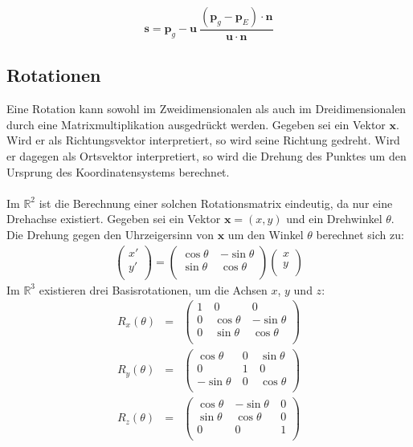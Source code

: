 \begin{equation}
\bm{s} = \bm{p}_g - \bm{u}\ \frac{(\bm{p}_g - \bm{p}_E)\cdot\bm{n}}{\bm{u}\cdot\bm{n}}
\end{equation}

\subsection{Rotationen}
\label{anhang_b_rotations}
Eine Rotation kann sowohl im Zweidimensionalen als auch im Dreidimensionalen durch eine Matrixmultiplikation ausgedrückt werden. Gegeben sei ein Vektor $\bm{x}$. Wird er als Richtungsvektor interpretiert, so wird seine Richtung gedreht. Wird er dagegen als Ortsvektor interpretiert, so wird die Drehung des Punktes um den Ursprung des Koordinatensystems berechnet.\\
\\
Im $\mathbb{R}^2$ ist die Berechnung einer solchen Rotationsmatrix eindeutig, da nur eine Drehachse existiert. Gegeben sei ein Vektor $\bm{x}=(x,y)$ und ein Drehwinkel $\theta$. Die Drehung gegen den Uhrzeigersinn von $\bm{x}$ um den Winkel $\theta$ berechnet sich zu:
\begin{eqnarray}
\left(
\begin{array}{c}
x'\\
y'\\
\end{array}
\right) =
\left(
\begin{array}{cc}
\cos\theta\ & -\sin\theta\\
\sin\theta\ & \cos\theta\\
\end{array}
\right)
\left(
\begin{array}{c}
x\\
y\\
\end{array}
\right)\nonumber
\end{eqnarray}
Im $\mathbb{R}^3$ existieren drei Basisrotationen, um die Achsen $x$, $y$ und $z$:
\begin{eqnarray}
R_x(\theta) &=& \left(
\begin{array}{ccc}
1\ & 0\ & 0\\
0\ & \cos\theta\ & -\sin\theta\\
0\ & \sin\theta\ & \cos\theta\\
\end{array}
\right)\nonumber\\
R_y(\theta) &=& \left(
\begin{array}{ccc}
\cos\theta\ & 0\ & \sin\theta\\
0\ & 1\ & 0\\
-\sin\theta\ & 0\ & \cos\theta\\
\end{array}
\right)\nonumber\\
R_z(\theta) &=& \left(
\begin{array}{ccc}
\cos\theta\ & -\sin\theta\ & 0\\
\sin\theta\ & \cos\theta\ & 0\\
0\ & 0\ & 1\\
\end{array}
\right)\nonumber
\end{eqnarray}
